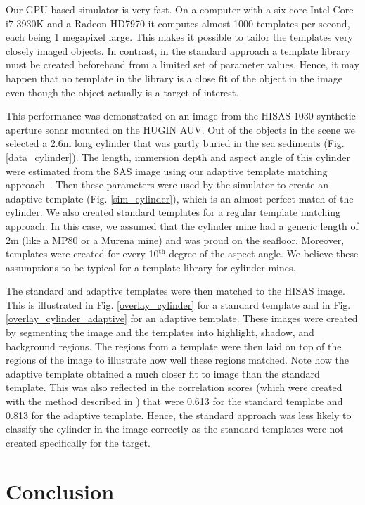 \documentclass[12pt,journal,draftclsnofoot,onecolumn]{IEEEtran}
\newcommand\1{\vec 1}
\begin{document}
Our GPU-based simulator is very fast. On a computer with a six-core Intel Core i7-3930K and a Radeon HD7970 it computes almost 1000 templates per second, each being 1 megapixel large. This makes it possible to tailor the templates very closely imaged objects. In contrast, in the standard approach a template library must be created beforehand from a limited set of parameter values. Hence, it may happen that no template in the library is a close fit of the object in the image even though the object actually is a target of interest.

This performance was demonstrated on an image from the HISAS 1030 synthetic aperture sonar mounted on the HUGIN AUV. Out of the objects in the scene we selected a 2.6\;m long cylinder that was partly buried in the sea sediments (Fig. \ref{data_cylinder}). The length, immersion depth and aspect angle of this cylinder were estimated from the SAS image using our  adaptive template matching approach~\cite{Midelfart2010}.  Then these parameters were used by the simulator to create an adaptive template (Fig. \ref{sim_cylinder}), which is an almost perfect match of the cylinder. We also created standard templates for a regular template matching approach. In this case, we assumed that the cylinder mine had a generic length of 2\;m (like a MP80 or a Murena mine) and was proud on the seafloor. Moreover, templates were created for every 10$^\text{th}$ degree of the aspect angle. We believe these assumptions to be typical for a template library for cylinder mines. 

The standard and adaptive templates were then matched to the HISAS image. This is illustrated in Fig. \ref{overlay_cylinder} for a standard template and in Fig. \ref{overlay_cylinder_adaptive} for an adaptive template. These images were created by segmenting the image and the templates into highlight, shadow, and background regions. The regions from a template were then laid on top of the regions of the image to illustrate how well these regions matched. Note how the adaptive template obtained a much closer fit to image than the standard template. This was also reflected in the correlation scores (which were created with the method described in \cite{Midelfart2010}) that were 0.613 for the standard template and 0.813 for the adaptive template. Hence, the standard approach was less likely to classify the cylinder in the image correctly as the standard templates were not created specifically for the target.


\section{Conclusion}\label{conclusion}
\end{document}
